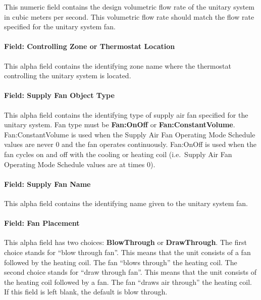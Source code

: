 This numeric field contains the design volumetric flow rate of the unitary system in cubic meters per second. This volumetric flow rate should match the flow rate specified for the unitary system fan.

\paragraph{Field: Controlling Zone or Thermostat Location}\label{field-controlling-zone-or-thermostat-location-6}

This alpha field contains the identifying zone name where the thermostat controlling the unitary system is located.

\paragraph{Field: Supply Fan Object Type}\label{field-supply-fan-object-type-4}

This alpha field contains the identifying type of supply air fan specified for the unitary system. Fan type must be \textbf{Fan:OnOff} or \textbf{Fan:ConstantVolume}. Fan:ConstantVolume is used when the Supply Air Fan Operating Mode Schedule values are never 0 and the fan operates continuously. Fan:OnOff is used when the fan cycles on and off with the cooling or heating coil (i.e.~Supply Air Fan Operating Mode Schedule values are at times 0).

\paragraph{Field: Supply Fan Name}\label{field-supply-fan-name-4}

This alpha field contains the identifying name given to the unitary system fan.

\paragraph{Field: Fan Placement}\label{field-fan-placement-5}

This alpha field has two choices: \textbf{BlowThrough} or \textbf{DrawThrough}. The first choice stands for ``blow through fan''. This means that the unit consists of a fan followed by the heating coil. The fan ``blows through'' the heating coil. The second choice stands for ``draw through fan''. This means that the unit consists of the heating coil followed by a fan. The fan ``draws air through'' the heating coil. If this field is left blank, the default is blow through.

